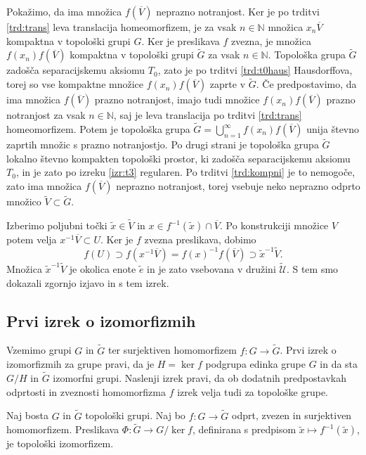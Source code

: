 \documentclass[mat1]{fmfdelo}
\newcommand{\N}{\mathbb N}
\newcommand{\Ucurl}{\mathcal{U}}
\newcommand{\closure}[1]{\overline{#1}}
\begin{document}
\begin{dokaz}
Pokažimo, da ima množica $f(\closure{V})$ neprazno notranjost. Ker je po trditvi \ref{trd:trans} leva translacija homeomorfizem, je za vsak $n \in \N$ množica $x_n\closure{V}$ kompaktna v topološki grupi $G$. Ker je preslikava $f$ zvezna, je množica $f(x_n)f(\closure{V})$ kompaktna v topološki grupi $\widetilde{G}$ za vsak $n \in \N$. Topološka grupa $\widetilde{G}$ zadošča separacijskemu aksiomu $T_0$, zato je po trditvi \ref{trd:t0haus} Hausdorffova, torej so vse kompaktne množice $f(x_n)f(\closure{V})$ zaprte v $\widetilde{G}$. Če predpostavimo, da ima množica $f(\closure{V})$ prazno notranjost, imajo tudi množice $f(x_n)f(\closure{V})$ prazno notranjost za vsak $n \in \N$, saj je leva translacija po trditvi \ref{trd:trans} homeomorfizem. Potem je topološka grupa $\widetilde{G} = \bigcup_{n=1}^\infty f(x_n)f(\closure{V})$ unija števno zaprtih množic s prazno notranjostjo. Po drugi strani je topološka grupa $\widetilde{G}$ lokalno števno kompakten topološki prostor, ki zadošča separacijskemu aksiomu $T_0$, in je zato po izreku \ref{izr:t3} regularen. Po trditvi \ref{trd:kompni} je to nemogoče, zato ima množica $f(\closure{V})$ neprazno notranjost, torej vsebuje neko neprazno odprto množico $\widetilde{V} \subset \widetilde{G}$.

Izberimo poljubni točki $\tilde{x} \in \widetilde{V}$ in $x \in f^{-1}(\tilde{x})\cap\closure{V}$.
Po konstrukciji množice $V$ potem velja $x^{-1}\closure{V} \subset U$. Ker je $f$ zvezna preslikava, dobimo
\[ f(U) \supset f(x^{-1}\closure{V}) = f(x)^{-1}f(\closure{V}) \supset \tilde{x}^{-1}\widetilde{V}. \]
Množica $\tilde{x}^{-1}\widetilde{V}$ je okolica enote $\tilde{e}$ in je zato vsebovana v družini $\widetilde{\Ucurl}$. S tem smo dokazali zgornjo izjavo in s tem izrek.
\end{dokaz}

\subsection{Prvi izrek o izomorfizmih}
Vzemimo grupi $G$ in $\widetilde{G}$ ter surjektiven homomorfizem $f\colon G \to \widetilde{G}$. Prvi izrek o izomorfizmih za grupe pravi, da je $H = \ker f$ podgrupa edinka grupe $G$ in da sta $G/H$ in $\widetilde{G}$ izomorfni grupi. Naslenji izrek pravi, da ob dodatnih predpostavkah odprtosti in zveznosti homomorfizma $f$ izrek velja tudi za topološke grupe.
\begin{izrek}\label{izr:prvitopizrek}
Naj bosta $G$ in $\widetilde{G}$ topološki grupi. Naj bo $f\colon G \to \widetilde{G}$ odprt, zvezen in surjektiven homomorfizem. Preslikava $\Phi\colon\widetilde{G} \to G/\ker f$, definirana s predpisom $\tilde{x} \mapsto f^{-1}(\tilde{x})$, je topološki izomorfizem.
\end{izrek}
\end{document}
